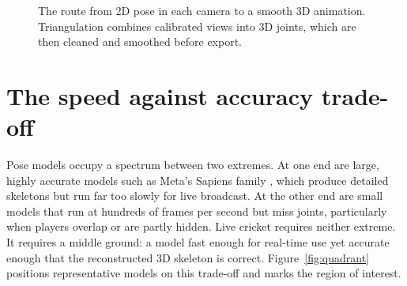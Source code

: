 \documentclass[oneside,openany]{book}
\begin{document}
\begin{figure}[ht]
\begin{center}
\caption{The route from 2D pose in each camera to a smooth 3D animation. Triangulation combines
calibrated views into 3D joints, which are then cleaned and smoothed before export.}
\label{fig:2dto3d}
\end{center}
\end{figure}

\section{The speed against accuracy trade-off}
Pose models occupy a spectrum between two extremes. At one end are large, highly accurate
models such as Meta's Sapiens family \cite{khirodkar2024sapiens}, which produce detailed
skeletons but run far too slowly for live broadcast. At the other end are small models that run
at hundreds of frames per second but miss joints, particularly when players overlap or are
partly hidden. Live cricket requires neither extreme. It requires a middle ground: a model fast
enough for real-time use yet accurate enough that the reconstructed 3D skeleton is correct.
Figure~\ref{fig:quadrant} positions representative models on this trade-off and marks the region
of interest.
\end{document}

